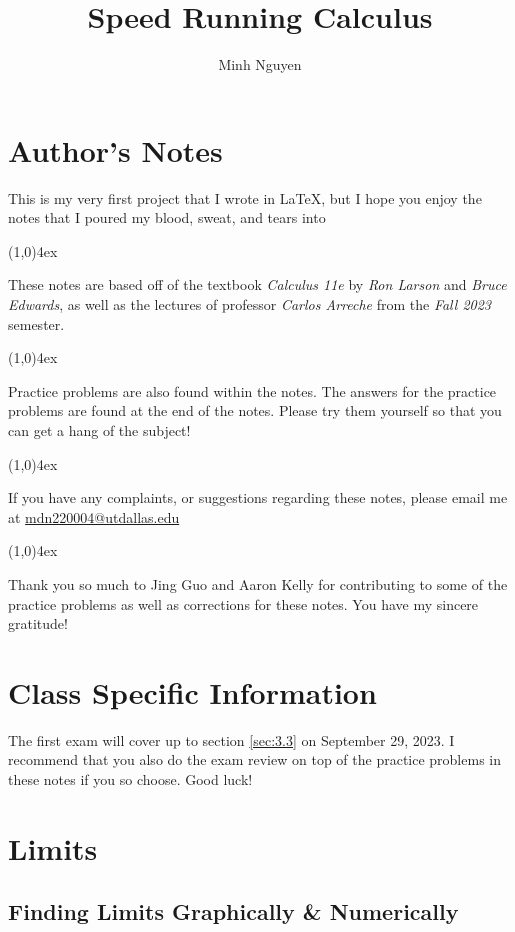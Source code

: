 \documentclass{MathNotes}
\title{Speed Running Calculus}
\author{Minh Nguyen}
\newcommand{\br}{
	\begin{center}
		\line(1,0){4ex}
	\end{center}}
\begin{document}
\newpage
\maketitle
{}
\tableofcontents
\newpage
\section*{Author's Notes}
This is my very first project that I wrote in \LaTeX, but I hope you enjoy
the notes that I poured my blood, sweat, and tears into 
\br
These notes are based off of the textbook \textit{Calculus 11e} by
\textit{Ron Larson} and \textit{Bruce Edwards}, as well as the lectures of
professor \textit{Carlos Arreche} from the \textit{Fall 2023} semester.
\br
Practice problems are also found within the notes. The answers for the practice
problems are found at the end of the notes. Please try them yourself so that
you can get a hang of the subject!
\br
If you have any complaints, or suggestions regarding these notes, please
email me at \newline\href{mailto:minh.nguyen7@utdallas.edu}{mdn220004@utdallas.edu}
\br
Thank you so much to Jing Guo and Aaron Kelly for contributing to some of the
practice problems as well as corrections for these notes. You have my sincere
gratitude!

\section*{Class Specific Information}
The first exam will cover up to section \ref{sec:3.3} on September 29, 2023.
I recommend that you also do the exam review on top of the practice problems
in these notes if you so choose. Good luck!
\newpage
{}

\section{Limits}\label{sec:1}
\subsection{Finding Limits Graphically \& Numerically}
\end{document}
